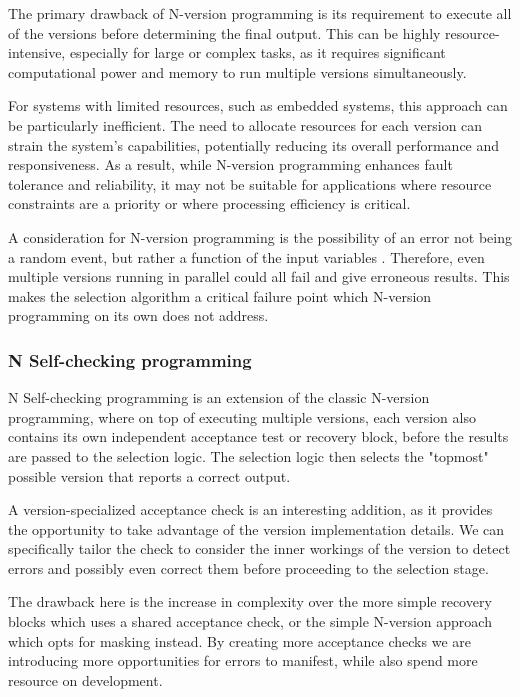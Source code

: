 \documentclass[12pt, letterpaper]{article}
\begin{document}
The primary drawback of N-version programming is its requirement to execute all of the versions before determining the final output. This can be highly resource-intensive, especially for large or complex tasks, as it requires significant computational power and memory to run multiple versions simultaneously.

For systems with limited resources, such as embedded systems, this approach can be particularly inefficient. The need to allocate resources for each version can strain the system's capabilities, potentially reducing its overall performance and responsiveness. As a result, while N-version programming enhances fault tolerance and reliability, it may not be suitable for applications where resource constraints are a priority or where processing efficiency is critical.

A consideration for N-version programming is the possibility of an error not being a random event, but rather a function of the input variables \cite{5326}. Therefore, even multiple versions running in parallel could all fail and give erroneous results. This makes the selection algorithm a critical failure point which N-version programming on its own does not address.

\subsubsection{N Self-checking programming}

N Self-checking programming is an extension of the classic N-version programming, where on top of executing multiple versions, each version also contains its own independent acceptance test or recovery block, before the results are passed to the selection logic. The selection logic then selects the "topmost" possible version that reports a correct output.

A version-specialized acceptance check is an interesting addition, as it provides the opportunity to take advantage of the version implementation details. We can specifically tailor the check to consider the inner workings of the version to detect errors and possibly even correct them before proceeding to the selection stage.

The drawback here is the increase in complexity over the more simple recovery blocks which uses a shared acceptance check, or the simple N-version approach which opts for masking instead. By creating more acceptance checks we are introducing more opportunities for errors to manifest, while also spend more resource on development.
\end{document}
